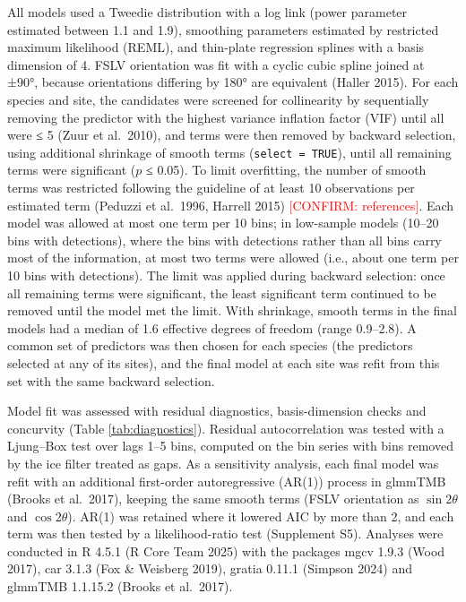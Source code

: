 \documentclass[
  11pt,
]{article}
\newcommand{\conf}[1]{\textcolor{red}{[CONFIRM: #1]}}
\begin{document}
All models used a Tweedie distribution with a log link (power parameter
estimated between 1.1 and 1.9), smoothing parameters estimated by
restricted maximum likelihood (REML), and thin-plate regression splines
with a basis dimension of 4. FSLV orientation was fit with a cyclic
cubic spline joined at ±90°, because orientations differing by 180° are
equivalent (Haller 2015). For each species and site, the candidates were
screened for collinearity by sequentially removing the predictor with
the highest variance inflation factor (VIF) until all were ≤ 5 (Zuur et
al.~2010), and terms were then removed by backward selection, using
additional shrinkage of smooth terms (\texttt{select\ =\ TRUE}), until
all remaining terms were significant (\(p\) ≤ 0.05). To limit
overfitting, the number of smooth terms was restricted following the
guideline of at least 10 observations per estimated term (Peduzzi et
al.~1996, Harrell 2015) \conf{references}. Each model was allowed at
most one term per 10 bins; in low-sample models (10--20 bins with
detections), where the bins with detections rather than all bins carry
most of the information, at most two terms were allowed (i.e., about one
term per 10 bins with detections). The limit was applied during backward
selection: once all remaining terms were significant, the least
significant term continued to be removed until the model met the limit.
With shrinkage, smooth terms in the final models had a median of 1.6
effective degrees of freedom (range 0.9--2.8). A common set of
predictors was then chosen for each species (the predictors selected at
any of its sites), and the final model at each site was refit from this
set with the same backward selection.

Model fit was assessed with residual diagnostics, basis-dimension checks
and concurvity (Table \ref{tab:diagnostics}). Residual autocorrelation
was tested with a Ljung--Box test over lags 1--5 bins, computed on the
bin series with bins removed by the ice filter treated as gaps. As a
sensitivity analysis, each final model was refit with an additional
first-order autoregressive (AR(1)) process in glmmTMB (Brooks et
al.~2017), keeping the same smooth terms (FSLV orientation as
\(\sin 2\theta\) and \(\cos 2\theta\)). AR(1) was retained where it
lowered AIC by more than 2, and each term was then tested by a
likelihood-ratio test (Supplement S5). Analyses were conducted in R
4.5.1 (R Core Team 2025) with the packages mgcv 1.9.3 (Wood 2017), car
3.1.3 (Fox \& Weisberg 2019), gratia 0.11.1 (Simpson 2024) and glmmTMB
1.1.15.2 (Brooks et al.~2017).
\end{document}
